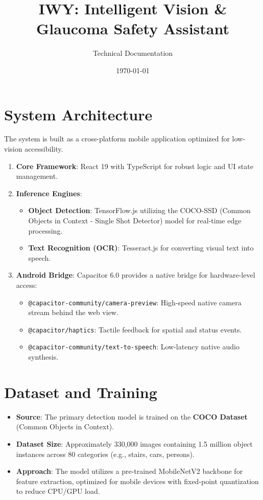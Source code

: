 \documentclass[12pt]{article}
\title{\textbf{IWY: Intelligent Vision \& Glaucoma Safety Assistant}}
\author{Technical Documentation}
\date{\today}
\begin{document}
\maketitle

\section{System Architecture}
The system is built as a cross-platform mobile application optimized for low-vision accessibility.
\begin{enumerate}
    \item \textbf{Core Framework}: React 19 with TypeScript for robust logic and UI state management.
    \item \textbf{Inference Engines}:
    \begin{itemize}
        \item \textbf{Object Detection}: TensorFlow.js utilizing the COCO-SSD (Common Objects in Context - Single Shot Detector) model for real-time edge processing.
        \item \textbf{Text Recognition (OCR)}: Tesseract.js for converting visual text into speech.
    \end{itemize}
    \item \textbf{Android Bridge}: Capacitor 6.0 provides a native bridge for hardware-level access:
    \begin{itemize}
        \item \texttt{@capacitor-community/camera-preview}: High-speed native camera stream behind the web view.
        \item \texttt{@capacitor/haptics}: Tactile feedback for spatial and status events.
        \item \texttt{@capacitor-community/text-to-speech}: Low-latency native audio synthesis.
    \end{itemize}
\end{enumerate}

\section{Dataset and Training}
\begin{itemize}
    \item \textbf{Source}: The primary detection model is trained on the \textbf{COCO Dataset} (Common Objects in Context).
    \item \textbf{Dataset Size}: Approximately 330,000 images containing 1.5 million object instances across 80 categories (e.g., stairs, cars, persons).
    \item \textbf{Approach}: The model utilizes a pre-trained MobileNetV2 backbone for feature extraction, optimized for mobile devices with fixed-point quantization to reduce CPU/GPU load.
\end{itemize}
\end{document}
